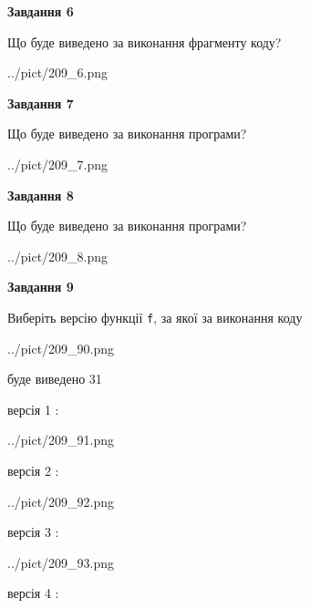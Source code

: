 \documentclass[12pt, ukrainian]{article}
\def\code#1{\Verb!#1!}
\begin{document}
{\begin {large}
{\begin {center}\textbf{Завдання 6}\end {center}}

Що буде виведено за виконання фрагменту коду?\par
\begin{center}
	{../pict/209_6.png}
\end{center}
\newpage

{\begin {center}\textbf{Завдання 7}\end {center}}

Що буде виведено за виконання програми?\par
\begin{center}
	{../pict/209_7.png}
\end{center}
\newpage

{\begin {center}\textbf{Завдання 8}\end {center}}

Що буде виведено за виконання програми?\par
\begin{center}
	{../pict/209_8.png}
\end{center}
\newpage

{\begin {center}\textbf{Завдання 9}\end {center}}

Виберіть версію функції \code{f}, за якої за виконання коду
\begin{center}
	{../pict/209_90.png}
\end{center}
буде виведено 31

\vspace{5mm}
версія 1 :

\begin{center}
	{../pict/209_91.png}
\end{center}
версія 2 :

\begin{center}
	{../pict/209_92.png}
\end{center}
версія 3 :

\begin{center}
	{../pict/209_93.png}
\end{center}
версія 4 :


\end{large}}
\end{document}
